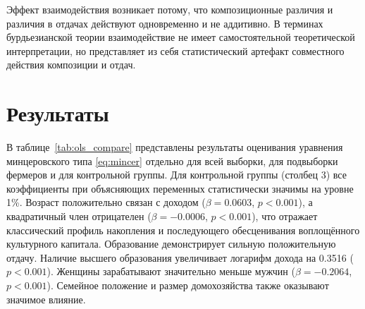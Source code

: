 \documentclass[14pt, a4paper]{article}
\begin{document}
	Эффект взаимодействия возникает потому, что композиционные различия и различия в отдачах действуют одновременно и не аддитивно. В терминах бурдьезианской теории взаимодействие не имеет самостоятельной теоретической интерпретации, но представляет из себя статистический артефакт совместного действия композиции и отдач.
	
	\section{Результаты}\label{sec:results}
	
	В таблице~\ref{tab:ols_compare} представлены результаты оценивания уравнения минцеровского типа \eqref{eq:mincer} отдельно для всей выборки, для подвыборки фермеров и для контрольной группы. Для контрольной группы (столбец 3) все коэффициенты при объясняющих переменных статистически значимы на уровне 1\%. Возраст положительно связан с доходом ($\beta = 0.0603$, $p < 0.001$), а квадратичный член отрицателен ($\beta = -0.0006$, $p < 0.001$), что отражает классический профиль накопления и последующего обесценивания воплощённого культурного капитала. Образование демонстрирует сильную положительную отдачу. Наличие высшего образования увеличивает логарифм дохода на 0.3516 ($p < 0.001$). Женщины зарабатывают значительно меньше мужчин ($\beta = -0.2064$, $p < 0.001$). Семейное положение и размер домохозяйства также оказывают значимое влияние.
	
\end{document}
